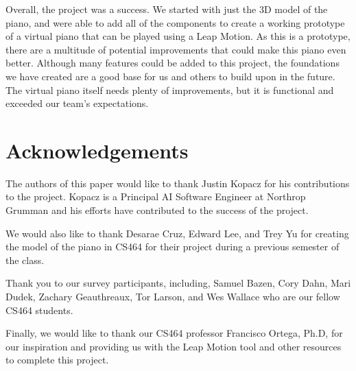\documentclass[conference,compsoc]{IEEEtran}
\begin{document}
Overall, the project was a success. We started with just the 3D model of the piano, and were able to add all of the components to create a working prototype of a virtual piano that can be played using a Leap Motion. As this is a prototype, there are a multitude of potential improvements that could make this piano even better. Although many features could be added to this project, the foundations we have created are a good base for us and others to build upon in the future. The virtual piano itself needs plenty of improvements, but it is functional and exceeded our team's expectations.

\section*{Acknowledgements}
The authors of this paper would like to thank Justin Kopacz for his contributions to the project. Kopacz is a Principal AI Software Engineer at Northrop Grumman and his efforts have contributed to the success of the project. 

We would also like to thank Desarae Cruz, Edward Lee, and Trey Yu for creating the model of the piano in CS464 for their project during a previous semester of the class. 

Thank you to our survey participants, including, Samuel Bazen, Cory Dahn, Mari Dudek, Zachary Geauthreaux, Tor Larson, and Wes Wallace who are our fellow CS464 students.

Finally, we would like to thank our CS464 professor Francisco Ortega, Ph.D, for our inspiration and providing us with the Leap Motion tool and other resources to complete this project.




\end{document}
